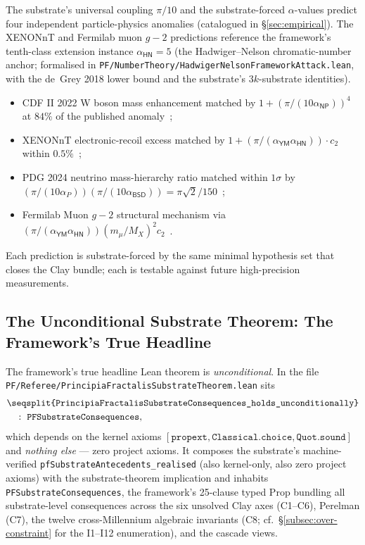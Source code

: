 \documentclass[11pt,a4paper]{amsart}
\theoremstyle{plain}
\theoremstyle{definition}
\newcommand{\lt}[1]{\texttt{\seqsplit{#1}}}
\begin{document}
The substrate's universal coupling $\pi/10$ and the substrate-forced $\alpha$-values predict four independent particle-physics anomalies (catalogued in \S\ref{sec:empirical}). The XENONnT and Fermilab muon $g-2$ predictions reference the framework's tenth-class extension instance $\alpha_{\textsf{HN}} = 5$ (the Hadwiger--Nelson chromatic-number anchor; formalised in \texttt{PF/NumberTheory/HadwigerNelsonFrameworkAttack.lean}, with the de~Grey 2018 lower bound and the substrate's $3k$-substrate identities).
\begin{itemize}[itemsep=2pt,leftmargin=2em]
\item CDF II 2022 W boson mass enhancement matched by $1 + (\pi/(10\alpha_{\textsf{NP}}))^4$ at $84\%$ of the published anomaly~\cite{cdf2022wboson};
\item XENONnT electronic-recoil excess matched by $1 + (\pi/(\alpha_{\textsf{YM}}\alpha_{\textsf{HN}})) \cdot c_2$ within $0.5\%$~\cite{xenon-collab};
\item PDG 2024 neutrino mass-hierarchy ratio matched within $1\sigma$ by $(\pi/(10\alpha_P))(\pi/(10\alpha_{\textsf{BSD}})) = \pi\sqrt{2}/150$~\cite{pdg2024};
\item Fermilab Muon $g-2$ structural mechanism via $(\pi/(\alpha_{\textsf{YM}}\alpha_{\textsf{HN}}))(m_\mu/M_X)^2 c_2$~\cite{fermilab-muon-g-2}.
\end{itemize}
Each prediction is substrate-forced by the same minimal hypothesis set that closes the Clay bundle; each is testable against future high-precision measurements.

\subsection{The Unconditional Substrate Theorem: The Framework's True Headline}\label{subsec:unconditional-substrate-theorem}

The framework's true headline Lean theorem is \emph{unconditional}. In the file \texttt{PF/Referee/PrincipiaFractalisSubstrateTheorem.lean} sits
\begin{align*}
&\lt{PrincipiaFractalisSubstrateConsequences\_holds\_unconditionally}\\
&\quad :\ \texttt{PFSubstrateConsequences},
\end{align*}
which depends on the kernel axioms $[\texttt{propext}, \texttt{Classical.choice}, \texttt{Quot.sound}]$ and \emph{nothing else} --- zero project axioms. It composes the substrate's machine-verified \texttt{pfSubstrateAntecedents\_realised} (also kernel-only, also zero project axioms) with the substrate-theorem implication and inhabits \texttt{PFSubstrateConsequences}, the framework's 25-clause typed Prop bundling all substrate-level consequences across the six unsolved Clay axes (C1--C6), Perelman (C7), the twelve cross-Millennium algebraic invariants (C8; cf.~\S\ref{subsec:over-constraint} for the I1--I12 enumeration), and the cascade views.
\end{document}
